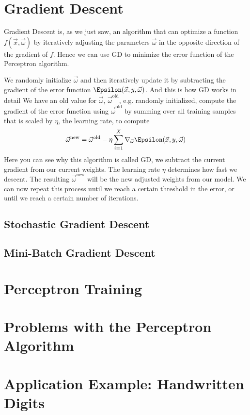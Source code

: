 \section{Gradient Descent}
\label{sec:gradient_descent}
Gradient Descent is, as we just saw, an algorithm that can optimize a function $f(\vec{x}, \vec{\omega})$ by iteratively adjusting the parameters $\vec{\omega}$ in the opposite direction of the gradient of $f$. Hence we can use GD to minimize the error function of the Perceptron algorithm.

We randomly initialize $\vec{\omega}$ and then iteratively update it by subtracting the gradient of the error function $\Epsilon(\vec{x}, y, \vec{\omega})$.
And this is how GD works in detail
We have an old value for $\vec{\omega}$, $\vec{\omega}^{\text{old}}$, e.g. randomly initialized, compute the gradient of the error function using $\vec{\omega}^{\text{old}}$ by summing over all training samples that is scaled by $\eta$, the learning rate, to compute
\begin{equation}
  \vec{\omega}^{\text{new}} = \vec{\omega}^{\text{old}} - \eta \sum_{i=1}^{X} \nabla_{\vec{\omega}} \Epsilon(\vec{x}, y, \vec{\omega})
\end{equation}
Here you can see why this algorithm is called GD, we subtract the current gradient from our current weights. The learning rate $\eta$ determines how fast we descent.
The resulting $\vec{\omega}^{\text{new}}$ will be the new adjusted weights from our model. We can now repeat this process until we reach a certain threshold in the error, or until we reach a certain number of iterations.

\subsection{Stochastic Gradient Descent}
\subsection{Mini-Batch Gradient Descent}

\section{Perceptron Training}
\section{Problems with the Perceptron Algorithm}
\section{Application Example: Handwritten Digits}
